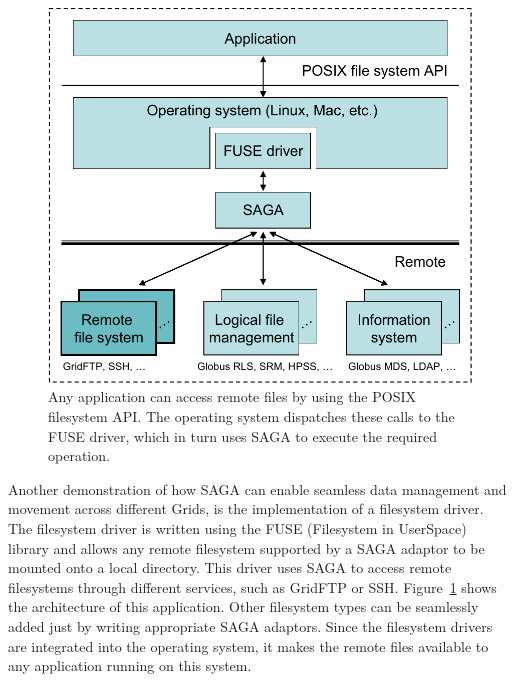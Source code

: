 \documentclass[conference,final]{IEEEtran}
\newcommand{\upup}{\vspace*{-1em}}
\begin{document}
\begin{figure}
\begin{center}
\includegraphics[scale=0.45]{../diagrams/FUSE_SAGA}
\end{center}
\caption{Any application can access remote files by using the POSIX filesystem
         API. The operating system dispatches these calls to the FUSE
         driver, which in turn uses SAGA to execute the required operation.\upup}
\label{fig:fuse_saga}
\end{figure}


Another demonstration of how SAGA can enable seamless data management
and movement across different Grids, is the implementation of a
filesystem driver.  The filesystem driver is written using the FUSE
(Filesystem in UserSpace)~\cite{fuse_web} library and allows any
remote filesystem supported by a SAGA adaptor to be mounted onto a
local directory.  This driver uses SAGA to access remote filesystems
through different services, such as GridFTP or SSH.
Figure~\ref{fig:fuse_saga} shows the architecture of this application.
Other filesystem types can be seamlessly added just by writing
appropriate SAGA adaptors. Since the filesystem drivers are integrated
into the operating system, it makes the remote files available to any
application running on this system.
\end{document}
